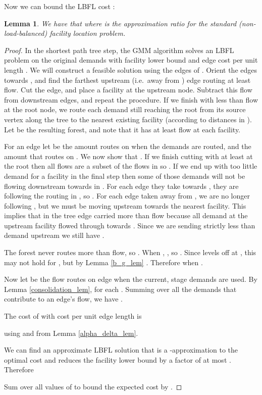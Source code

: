 \documentclass[11pt]{article}
\newtheorem{lem}[thm]{Lemma}
\begin{document}
Now we can bound the LBFL cost :

\begin{lem} We have that  where  is the approximation ratio for the standard (non-load-balanced) facility location problem.
\label{facility_cost_lem}
\end{lem}

\begin{proof}
In the shortest path tree step, the GMM algorithm solves an LBFL problem on the original demands  with facility lower bound  and edge cost per unit length .  
We will construct a feasible solution using the edges of .
Orient the edges towards , and find the farthest upstream (i.e.\ away from ) edge routing at least   flow.  Cut the edge, and place a facility at the upstream node.  Subtract this flow from downstream edges, and repeat the procedure.  
If we finish with less than  flow at the root node, we route each demand still reaching the root from its source vertex along the tree to the nearest existing facility (according to distances in ).  Let  be the resulting forest, and note that it has at least  flow at each facility.

For an edge  let  be the amount  routes on  when the demands  are routed, and  the amount that  routes on .  We now show that .  If we finish cutting  with at least  at the root then all flows are a subset of the flows in  so .  If we end up with too little demand for a facility in the final step then some of those demands will not be flowing downstream towards  in .  For each edge they take towards , they are following the routing in , so .  For each  edge taken away from , we are no longer following , but we must be moving upstream towards the nearest facility.  This implies that in the tree  edge  carried more than  flow because all demand at the upstream facility flowed through  towards .  Since we are sending strictly less than  demand upstream we still have .

The forest  never routes more than  flow, so .  
When , , so .  
Since  levels off at , this may not hold for  , but by Lemma \ref{b_g_lem} .
Therefore  when .

Now let  be the flow  routes on edge  when the current, stage  demands  are used.  By Lemma \ref{consolidation_lem},  for each .  Summing over all the demands that contribute to an edge's flow, we have .

The cost of  with  cost per unit edge length is

using  and  from Lemma \ref{alpha_delta_lem}.

We can find an approximate LBFL solution that is a -approximation to the optimal cost and reduces the facility lower bound by a factor of at most .  Therefore


Sum over all values of  to bound the expected cost by .
\end{proof}
\end{document}
